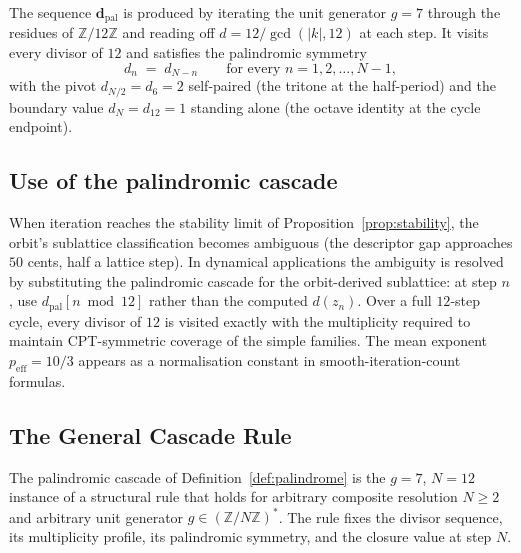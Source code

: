 \documentclass[11pt,a4paper]{article}
\theoremstyle{definition}
\theoremstyle{remark}
\newcommand{\Z}{\mathbb{Z}}
\begin{document}
The sequence $\mathbf{d}_{\mathrm{pal}}$ is produced by iterating the unit generator $g=7$ through the residues of $\Z/12\Z$ and reading off $d = 12/\gcd(|k|,12)$ at each step. It visits every divisor of $12$ and satisfies the palindromic symmetry
\begin{equation}\label{eq:palindrome}
d_{n} \;=\; d_{N-n} \qquad\text{for every } n = 1,2,\ldots,N-1,
\end{equation}
with the pivot $d_{N/2}=d_{6}=2$ self-paired (the tritone at the half-period) and the boundary value $d_{N}=d_{12}=1$ standing alone (the octave identity at the cycle endpoint).

\subsection{Use of the palindromic cascade}

When iteration reaches the stability limit of Proposition~\ref{prop:stability}, the orbit's sublattice classification becomes ambiguous (the descriptor gap approaches $50$ cents, half a lattice step). In dynamical applications the ambiguity is resolved by substituting the palindromic cascade for the orbit-derived sublattice: at step $n$, use $d_{\mathrm{pal}}[n\bmod 12]$ rather than the computed $d(z_{n})$. Over a full $12$-step cycle, every divisor of $12$ is visited exactly with the multiplicity required to maintain CPT-symmetric coverage of the simple families. The mean exponent $p_{\mathrm{eff}}=10/3$ appears as a normalisation constant in smooth-iteration-count formulas.

\subsection{The General Cascade Rule}\label{subsec:general-cascade-rule}

The palindromic cascade of Definition~\ref{def:palindrome} is the $g=7$, $N=12$ instance of a structural rule that holds for arbitrary composite resolution $N\ge 2$ and arbitrary unit generator $g \in (\mathbb{Z}/N\mathbb{Z})^{*}$. The rule fixes the divisor sequence, its multiplicity profile, its palindromic symmetry, and the closure value at step $N$.
\end{document}
